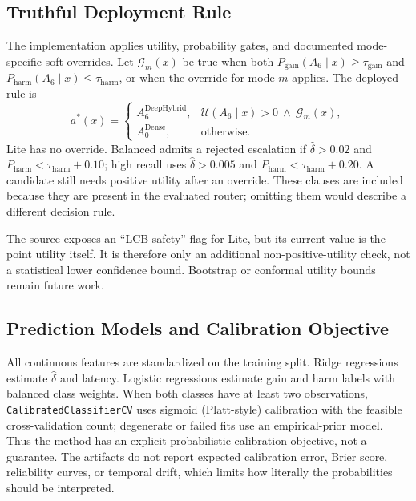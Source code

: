 \documentclass[10pt,journal]{IEEEtran}
\newcommand{\pgain}{P_{\mathrm{gain}}}
\newcommand{\pharm}{P_{\mathrm{harm}}}
\begin{document}
\subsection{Truthful Deployment Rule}

The implementation applies utility, probability gates, and documented mode-specific soft overrides. Let $\mathcal{G}_m(x)$ be true when both $\pgain(A_6\mid x)\geq\tau_{\mathrm{gain}}$ and $\pharm(A_6\mid x)\leq\tau_{\mathrm{harm}}$, or when the override for mode $m$ applies. The deployed rule is
\begin{equation}
a^*(x)=
\begin{cases}
A_6^{\mathrm{DeepHybrid}},&
\mathcal{U}(A_6\mid x)>0\ \land\ \mathcal{G}_m(x),\\
A_0^{\mathrm{Dense}},&\text{otherwise.}
\end{cases}
\label{eq:decision}
\end{equation}
Lite has no override. Balanced admits a rejected escalation if $\hat{\delta}>0.02$ and $\pharm<\tau_{\mathrm{harm}}+0.10$; high recall uses $\hat{\delta}>0.005$ and $\pharm<\tau_{\mathrm{harm}}+0.20$. A candidate still needs positive utility after an override. These clauses are included because they are present in the evaluated router; omitting them would describe a different decision rule.

The source exposes an ``LCB safety'' flag for Lite, but its current value is the point utility itself. It is therefore only an additional non-positive-utility check, not a statistical lower confidence bound. Bootstrap or conformal utility bounds remain future work.

\subsection{Prediction Models and Calibration Objective}

All continuous features are standardized on the training split. Ridge regressions estimate $\hat{\delta}$ and latency. Logistic regressions estimate gain and harm labels with balanced class weights. When both classes have at least two observations, \texttt{CalibratedClassifierCV} uses sigmoid (Platt-style) calibration with the feasible cross-validation count; degenerate or failed fits use an empirical-prior model. Thus the method has an explicit probabilistic calibration objective, not a guarantee. The artifacts do not report expected calibration error, Brier score, reliability curves, or temporal drift, which limits how literally the probabilities should be interpreted.
\end{document}
